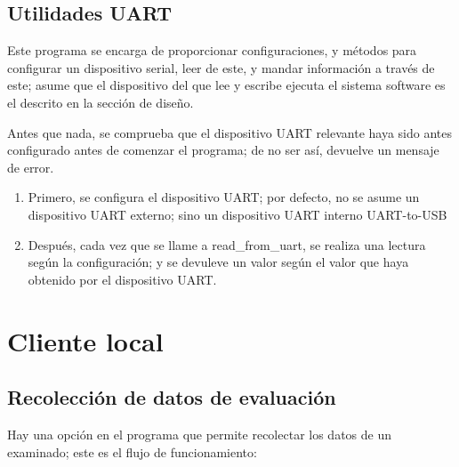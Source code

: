 \documentclass[12pt,a4paper,twoside,openright]{book}
\begin{document}
\subsection{Utilidades UART}

Este programa se encarga de proporcionar configuraciones, y métodos para configurar un dispositivo serial, leer de este, y mandar información a través de este; asume que el dispositivo del que lee y escribe ejecuta el sistema software es el descrito en la sección de diseño.

Antes que nada, se comprueba que el dispositivo UART relevante haya sido antes configurado antes de comenzar el programa; de no ser así, devuelve un mensaje de error.

\begin{enumerate}
\item Primero, se configura el dispositivo UART; por defecto, no se asume un dispositivo UART externo; sino un dispositivo UART interno UART-to-USB
\item Después, cada vez que se llame a read\_from\_uart, se realiza una lectura según la configuración; y se devuleve un valor según el valor que haya obtenido por el dispositivo UART.
\end{enumerate}

\section{Cliente local}

\subsection{Recolección de datos de evaluación}

Hay una opción en el programa que permite recolectar los datos de un examinado; este es el flujo de funcionamiento:
\end{document}
